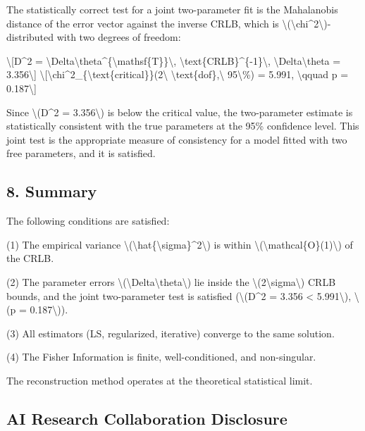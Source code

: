 \documentclass[
  10pt,
]{article}
\begin{document}
The statistically correct test for a joint two-parameter fit is the
Mahalanobis distance of the error vector against the inverse CRLB, which
is \textbackslash(\textbackslash chi\^{}2\textbackslash)-distributed
with two degrees of freedom:

\textbackslash{[}D\^{}2 =
\textbackslash Delta\textbackslash theta\^{}\{\textbackslash mathsf\{T\}\}\textbackslash,
\textbackslash text\{CRLB\}\^{}\{-1\}\textbackslash,
\textbackslash Delta\textbackslash theta = 3.356\textbackslash{]}
\textbackslash{[}\textbackslash chi\^{}2\_\{\textbackslash text\{critical\}\}(2\textbackslash{}
\textbackslash text\{dof\},\textbackslash{} 95\textbackslash\%) = 5.991,
\textbackslash qquad p = 0.187\textbackslash{]}

Since \textbackslash(D\^{}2 = 3.356\textbackslash) is below the critical
value, the two-parameter estimate is statistically consistent with the
true parameters at the 95\% confidence level. This joint test is the
appropriate measure of consistency for a model fitted with two free
parameters, and it is satisfied.

\hypertarget{summary}{%
\subsection{8. Summary}\label{summary}}

The following conditions are satisfied:

(1) The empirical variance
\textbackslash(\textbackslash hat\{\textbackslash sigma\}\^{}2\textbackslash)
is within \textbackslash(\textbackslash mathcal\{O\}(1)\textbackslash)
of the CRLB.

(2) The parameter errors
\textbackslash(\textbar\textbackslash Delta\textbackslash theta\textbar\textbackslash)
lie inside the \textbackslash(2\textbackslash sigma\textbackslash) CRLB
bounds, and the joint two-parameter test is satisfied
(\textbackslash(D\^{}2 = 3.356 \textless{} 5.991\textbackslash),
\textbackslash(p = 0.187\textbackslash)).

(3) All estimators (LS, regularized, iterative) converge to the same
solution.

(4) The Fisher Information is finite, well-conditioned, and
non-singular.

The reconstruction method operates at the theoretical statistical limit.

\hypertarget{ai-research-collaboration-disclosure}{%
\subsection{AI Research Collaboration
Disclosure}\label{ai-research-collaboration-disclosure}}
\end{document}
